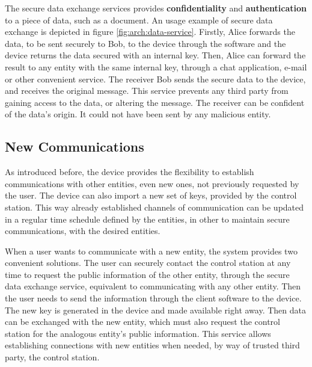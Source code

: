 The secure data exchange services provides \textbf{confidentiality} and \textbf{authentication} to a piece of data, such as a document.
An usage example of secure data exchange is depicted in figure \ref{fig:arch:data-service}. Firstly, Alice forwards the data, to be sent securely to Bob, to the device through the software and the device returns the data secured with an internal key. Then, Alice can forward the result to any entity with the same internal key, through a chat application, e-mail or other convenient service.
The receiver Bob sends the secure data to the device, and receives the original message.
This service prevents any third party from gaining access to the data, or altering the message. The receiver can be confident of the data's origin. It could not have been sent by any malicious entity.


\subsection{New Communications}\label{chap:arch:ops:new}

As introduced before, the device provides the flexibility to establish communications with other entities, even new ones, not previously requested by the user.
The device can also import a new set of keys, provided by the control station.
This way already established channels of communication can be updated in a regular time schedule defined by the entities, in other to maintain secure communications, with the desired entities.

When a user wants to communicate with a new entity, the system provides two convenient solutions. The user can securely contact the control station at any time to request the public information of the other entity, through the secure data exchange service, equivalent to communicating with any other entity.
Then the user needs to send the information through the client software to the device. The new key is generated in the device and made available right away. Then data can be exchanged with the new entity, which must also request the control station for the analogous entity's public information.
This service allows establishing connections with new entities when needed, by way of trusted third party, the control station. 

